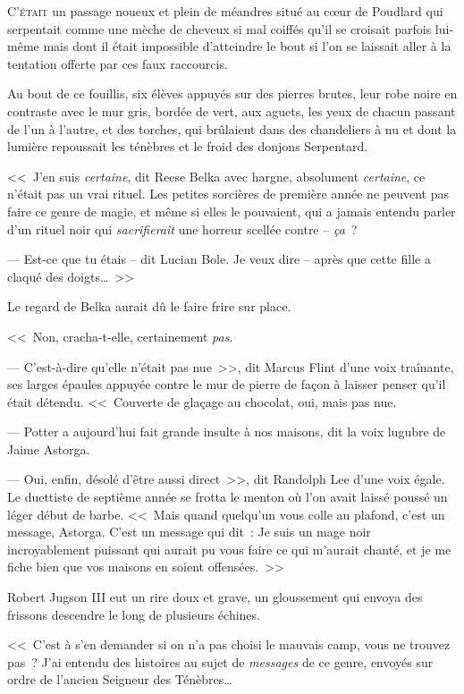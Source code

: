 
\lettrine{C}{'était} un passage noueux et plein de méandres situé au cœur de Poudlard qui serpentait comme une mèche de cheveux si mal coiffés qu'il se croisait parfois lui-même mais dont il était impossible d'atteindre le bout si l'on se laissait aller à la tentation offerte par ces faux raccourcis.

Au bout de ce fouillis, six élèves appuyés sur des pierres brutes, leur robe noire en contraste avec le mur gris, bordée de vert, aux aguets, les yeux de chacun passant de l'un à l'autre, et des torches, qui brûlaient dans des chandeliers à nu et dont la lumière repoussait les ténèbres et le froid des donjons Serpentard.

<<~J'en suis \emph{certaine}, dit Reese Belka avec hargne, absolument \emph{certaine}, ce n'était pas un vrai rituel. Les petites sorcières de première année ne peuvent pas faire ce genre de magie, et même si elles le pouvaient, qui a jamais entendu parler d'un rituel noir qui \emph{sacrifierait} une horreur scellée contre -- \emph{ça}~?

--- Est-ce que tu étais -- dit Lucian Bole. Je veux dire -- après que cette fille a claqué des doigts…~>>

Le regard de Belka aurait dû le faire frire sur place.

<<~Non, cracha-t-elle, certainement \emph{pas}.

--- C'est-à-dire qu'elle n'était pas nue~>>, dit Marcus Flint d'une voix traînante, ses larges épaules appuyée contre le mur de pierre de façon à laisser penser qu'il était détendu. <<~Couverte de glaçage au chocolat, oui, mais pas nue.

--- Potter a aujourd'hui fait grande insulte à nos maisons, dit la voix lugubre de Jaime Astorga.

--- Oui, enfin, désolé d'être aussi direct~>>, dit Randolph Lee d'une voix égale. Le duettiste de septième année se frotta le menton où l'on avait laissé poussé un léger début de barbe. <<~Mais quand quelqu'un vous colle au plafond, c'est un message, Astorga. C'est un message qui dit~: Je suis un mage noir incroyablement puissant qui aurait pu vous faire ce qui m'aurait chanté, et je me fiche bien que vos maisons en soient offensées.~>>

Robert Jugson III eut un rire doux et grave, un gloussement qui envoya des frissons descendre le long de plusieurs échines.

<<~C'est à s'en demander si on n'a pas choisi le mauvais camp, vous ne trouvez pas~? J'ai entendu des histoires au sujet de \emph{messages} de ce genre, envoyés sur ordre de l'ancien Seigneur des Ténèbres…

